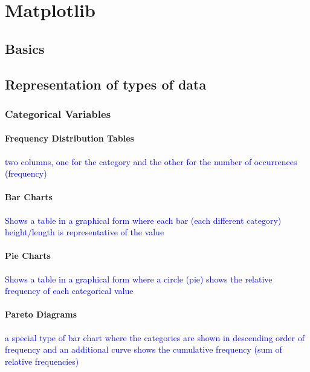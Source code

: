 \section{Matplotlib}

\subsection{Basics}

\subsection{Representation of types of data}

\subsubsection{Categorical Variables}

\paragraph{Frequency Distribution Tables}

\textcolor{blue}{two columns, one for the category and the other for the number of occurrences (frequency)}

\paragraph{Bar Charts}

\textcolor{blue}{Shows a table in a graphical form where each bar (each different category) height/length is representative of the value}

\paragraph{Pie Charts}

\textcolor{blue}{Shows a table in a graphical form where a circle (pie) shows the relative frequency of each categorical value}

\paragraph{Pareto Diagrams}

\textcolor{blue}{a special type of bar chart where the categories are shown in descending order of frequency and an additional curve shows the cumulative frequency (sum of relative frequencies)}


